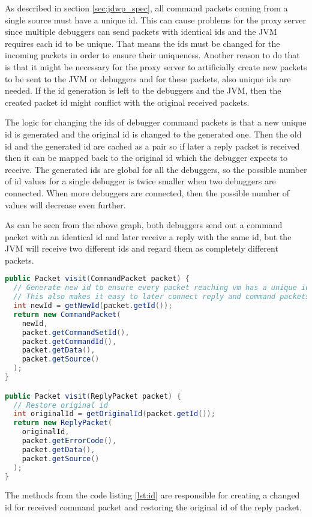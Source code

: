 \documentclass[..thesis.tex]{subfiles}
\begin{document}
As described in section \ref{sec:jdwp_spec}, all command packets coming from a single source must have a unique id.
This can cause problems for the proxy server since multiple debuggers can send packets with identical ids and the JVM requires each id to be unique.
That means the ids must be changed for the incoming packets in order to ensure their uniqueness.
Another reason to do that is that it might be necessary for the proxy server to artificially create new packets to be sent to the JVM or debuggers and for these packets, also unique ids are needed.
If the id generation is left to the debuggers and the JVM, then the created packet id might conflict with the original received packets.

The logic for changing the ids of debugger command packets is that a new unique id is generated and the original id is changed to the generated one.
Then the old id and the generated id are cached as a pair so if later a reply packet is received then it can be mapped back to the original id which the debugger expects to receive.
The generated ids are global for all the debuggers, so the possible number of id values for a single debugger is twice smaller when two debuggers are connected.
When more debuggers are connected, then the possible number of values will decrease even further.



As can be seen from the above graph, both debuggers send out a command packet with an identical id and later receive a reply with the same id, but the JVM will receive two different ids and regard them as completely different packets.

\begin{lstlisting}[language=java, caption={\textit{Visitor methods for processing the ids of received and written debugger packets.}}, captionpos=b, label={lst:id}]
public Packet visit(CommandPacket packet) {
  // Generate new id to ensure every packet reaching vm has a unique id
  // This also makes it easy to later connect reply and command packets and avoid collision
  int newId = getNewId(packet.getId());
  return new CommandPacket(
    newId,
    packet.getCommandSetId(), 
    packet.getCommandId(), 
    packet.getData(), 
    packet.getSource()
  );
}

public Packet visit(ReplyPacket packet) {
  // Restore original id
  int originalId = getOriginalId(packet.getId());
  return new ReplyPacket(
    originalId,
    packet.getErrorCode(), 
    packet.getData(), 
    packet.getSource()
  );
}
\end{lstlisting}

The  methods from the code listing \ref{lst:id} are responsible for creating a changed id for received command packet and restoring the original id of the reply packet.
\end{document}
